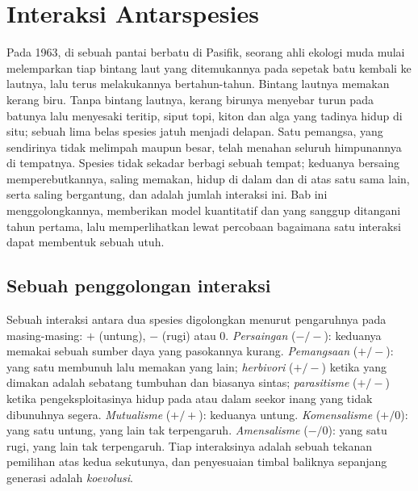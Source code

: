 \chapter{Interaksi Antarspesies}\label{ch:b1:species-interactions}

Pada 1963, di sebuah pantai berbatu di Pasifik, seorang ahli ekologi
muda mulai melemparkan tiap bintang laut yang ditemukannya pada
sepetak batu kembali ke lautnya, lalu terus melakukannya
bertahun-tahun. Bintang lautnya memakan kerang biru. Tanpa bintang
lautnya, kerang birunya menyebar turun pada batunya lalu menyesaki
teritip, siput topi, kiton dan alga yang tadinya hidup di situ; sebuah
 lima belas spesies jatuh menjadi delapan. Satu pemangsa,
yang sendirinya tidak melimpah maupun besar, telah menahan seluruh
himpunannya di tempatnya. Spesies tidak sekadar berbagi sebuah tempat;
keduanya bersaing memperebutkannya, saling memakan, hidup di dalam dan
di atas satu sama lain, serta saling bergantung, dan 
adalah jumlah interaksi ini. Bab ini menggolongkannya, memberikan
model kuantitatif  dan  yang sanggup ditangani
tahun pertama, lalu memperlihatkan lewat percobaan bagaimana satu
interaksi dapat membentuk sebuah  utuh.

\section{Sebuah penggolongan interaksi}

\begin{definition}\label{def:b1:species-interactions:types}
Sebuah interaksi antara dua spesies digolongkan menurut pengaruhnya
pada masing-masing: $+$ (untung), $-$ (rugi) atau $0$.
\emph{Persaingan} ($-/-$): keduanya memakai sebuah sumber daya yang
pasokannya kurang. \emph{Pemangsaan} ($+/-$): yang satu membunuh lalu
memakan yang lain; \emph{herbivori} ($+/-$) ketika yang dimakan adalah
sebatang tumbuhan dan biasanya sintas; \emph{parasitisme} ($+/-$)
ketika pengeksploitasinya hidup pada atau dalam seekor inang yang tidak
dibunuhnya segera. \emph{Mutualisme} ($+/+$): keduanya untung.
\emph{Komensalisme} ($+/0$): yang satu untung, yang lain tak
terpengaruh. \emph{Amensalisme} ($-/0$): yang satu rugi, yang lain tak
terpengaruh. Tiap interaksinya adalah sebuah tekanan pemilihan atas
kedua sekutunya, dan penyesuaian timbal baliknya sepanjang generasi
adalah \emph{koevolusi}.
\end{definition}

